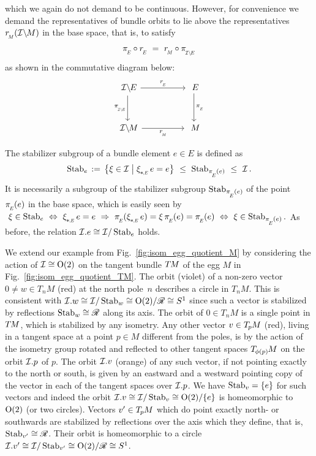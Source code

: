 which we again do not demand to be continuous.
However, for convenience we demand the representatives of bundle orbits to lie above the representatives $\rM(\IM)$ in the base space, that is, to satisfy
\begin{align}\label{eq:bundle_quotient_section_isom}
    \piE \circ \rE \ =\ \rM \circ \piIE
\end{align}
as shown in the commutative diagram below:
\begin{equation}
\begin{tikzcd}[column sep=50pt, row sep=30, font=\normalsize]
    \IE     \arrow[d, "\piIE"']
            \arrow[r, "\rE"]
    &
    E       \arrow[d, "\piE"]
    \\
    \IM     \arrow[r, "\rM"']
    &
    M
\end{tikzcd}
\end{equation}


The stabilizer subgroup of a bundle element $e\in E$ is defined as
\begin{align}
    \Stab{e} \,:=\, \big\{ \xi \in \I \;\big|\; \dxiE e=e \big\} \ \leq\ \Stab{\piE(e)}\ \leq\ \I \,.
\end{align}
It is necessarily a subgroup of the stabilizer subgroup $\Stab{\piE(e)}$ of the point $\piE(e)$ in the base space, which is easily seen by
$ \ \xi \in \Stab{e}                        \ \Leftrightarrow\ 
    \dxiE e = e                             \ \Rightarrow\ 
    \piE(\dxiE e) = \xi\, \piE(e) = \piE(e) \ \Leftrightarrow\ 
    \xi \in \Stab{\piE(e)} .
$
As before, the relation $\mathcal{I}.e \cong \mathcal{I}/\operatorname{Stab}_{e}$ holds.


We extend our example from Fig.~\ref{fig:isom_egg_quotient_M} by considering the action of $\mathcal{I}\cong\operatorname{O}(2)$ on the tangent bundle $T\mkern-1.5muM$ of the egg $M$ in Fig.~\ref{fig:isom_egg_quotient_TM}.
The orbit (violet) of a non-zero vector $0\neq w\in T_nM$ (red) at the north pole~$n$ describes a circle in $T_nM$.
This is consistent with $\mathcal{I}.w \cong \mathcal{I}/\operatorname{Stab}_{w} \cong \operatorname{O}(2)/\mathscr{R} \cong S^1$ since such a vector is stabilized by reflections $\operatorname{Stab}_{w} \cong \mathscr{R}$ along its axis.
The orbit of $0\in T_nM$ is a single point in $T\mkern-1.5muM$, which is stabilized by any isometry.
Any other vector $v\in T_{\mkern-1.5mu p}\mkern-.5muM$ (red), living in a tangent space at a point $p\in M$ different from the poles, is by the action of the isometry group rotated and reflected to other tangent spaces $T_{\mkern-1.5mu \phi(p)}\mkern-1muM$ on the orbit $\mathcal{I}.p$ of $p$.
The orbit $\mathcal{I}.v$ (orange) of any such vector, if not pointing exactly to the north or south, is given by an eastward and a westward pointing copy of the vector in each of the tangent spaces over $\mathcal{I}.p$.
We have $\operatorname{Stab}_{v}=\{e\}$ for such vectors and indeed the orbit $\mathcal{I}.v \cong \mathcal{I}/\operatorname{Stab}_{v} \cong \operatorname{O}(2)/\{e\}$ is homeomorphic to $\operatorname{O}(2)$ (or two circles).
Vectors $v'\in T_{\mkern-1.5mu p}\mkern-.5muM$ which do point exactly north- or southwards are stabilized by reflections over the axis which they define, that is, $\operatorname{Stab}_{v'} \cong \mathscr{R}$.
Their orbit is homeomorphic to a circle $\mathcal{I}.v' \cong \mathcal{I}/\operatorname{Stab}_{v'} \cong \operatorname{O}(2)/\mathscr{R} \cong S^1$.

